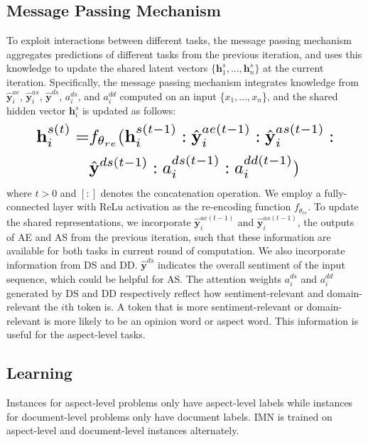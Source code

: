 \documentclass[11pt,a4paper]{article}
\begin{document}
\subsection{Message Passing Mechanism}
To exploit interactions between different tasks, the message passing mechanism aggregates predictions of different tasks from the previous iteration, and uses this knowledge to update the shared latent vectors $\{\mathbf{h}^s_{1}, ..., \mathbf{h}^s_{n}\}$ at the current iteration. 
Specifically, the message passing mechanism integrates knowledge from $\hat{\mathbf{y}}^{ae}_i$, $\hat{\mathbf{y}}^{as}_i$, $\hat{\mathbf{y}}^{ds}$, $a_i^{ds}$, and $a_i^{dd}$ computed on an input \{$x_1, ..., x_n$\}, and the shared hidden vector $\mathbf{h}^s_{i}$ is updated as follows:
\begin{equation}
\resizebox{.87\hsize}{!}{$
\begin{split}
    \mathbf{h}^{s(t)}_i= 
    &f_{\theta_{re}}(\mathbf{h}_i^{s(t-1)}: \hat{\mathbf{y}}_i^{ae(t-1)}: \hat{\mathbf{y}}_i^{as(t-1)}:\\ &\hat{\mathbf{y}}^{ds(t-1)}: a_i^{ds(t-1)}: a_i^{dd(t-1)})
\end{split}
$}\label{update_hidden}
\end{equation}
where $t>0$ and $[:]$ denotes the concatenation operation.
We employ a fully-connected layer with ReLu activation as the re-encoding function $f_{\theta_{re}}$. 
To update the shared representations, we incorporate $\hat{\mathbf{y}}_i^{ae(t-1)}$ and $\hat{\mathbf{y}}_i^{as(t-1)}$, the outputs of AE and AS from the previous iteration, such that these information are available for both tasks in current round of computation.
We also incorporate information from DS and DD. $\hat{\mathbf{y}}^{ds}$ indicates the overall sentiment of the input sequence, which could be helpful for AS. The attention weights $a_i^{ds}$ and $a_i^{dd}$ generated by DS and DD respectively reflect how sentiment-relevant and domain-relevant the $i$th token is. A token that is more sentiment-relevant or domain-relevant is more likely to be an opinion word or aspect word. This information is useful for the aspect-level tasks. 



\subsection{Learning}
Instances for aspect-level problems only have aspect-level labels while instances for document-level problems only have document labels.  IMN is trained on aspect-level and document-level instances alternately. 
\end{document}
